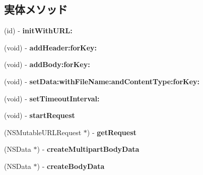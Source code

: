 \subsection*{実体メソッド}
\begin{DoxyCompactItemize}
\item 
\hypertarget{interface_r9_h_t_t_p_request_extension_a3132b244d04c4132fbe71bb4bc282518}{}(id) -\/ {\bfseries init\+With\+U\+R\+L\+:}\label{interface_r9_h_t_t_p_request_extension_a3132b244d04c4132fbe71bb4bc282518}

\item 
\hypertarget{interface_r9_h_t_t_p_request_extension_a095713bf01778a3fabd870784b29791a}{}(void) -\/ {\bfseries add\+Header\+:for\+Key\+:}\label{interface_r9_h_t_t_p_request_extension_a095713bf01778a3fabd870784b29791a}

\item 
\hypertarget{interface_r9_h_t_t_p_request_extension_a7459e8f6b487d60bc6bc8e1f3c26ee78}{}(void) -\/ {\bfseries add\+Body\+:for\+Key\+:}\label{interface_r9_h_t_t_p_request_extension_a7459e8f6b487d60bc6bc8e1f3c26ee78}

\item 
\hypertarget{interface_r9_h_t_t_p_request_extension_ac5e0f736cfc0e8defae6746a2305674a}{}(void) -\/ {\bfseries set\+Data\+:with\+File\+Name\+:and\+Content\+Type\+:for\+Key\+:}\label{interface_r9_h_t_t_p_request_extension_ac5e0f736cfc0e8defae6746a2305674a}

\item 
\hypertarget{interface_r9_h_t_t_p_request_extension_a2afdced2ff69fa98768e041ce9dc0ffb}{}(void) -\/ {\bfseries set\+Timeout\+Interval\+:}\label{interface_r9_h_t_t_p_request_extension_a2afdced2ff69fa98768e041ce9dc0ffb}

\item 
\hypertarget{interface_r9_h_t_t_p_request_extension_a45f1593efbe04c21c6816d72dfab37d2}{}(void) -\/ {\bfseries start\+Request}\label{interface_r9_h_t_t_p_request_extension_a45f1593efbe04c21c6816d72dfab37d2}

\item 
\hypertarget{interface_r9_h_t_t_p_request_extension_a96a0bb891310cdabb4d1f3f62f9dfd1f}{}(N\+S\+Mutable\+U\+R\+L\+Request $\ast$) -\/ {\bfseries get\+Request}\label{interface_r9_h_t_t_p_request_extension_a96a0bb891310cdabb4d1f3f62f9dfd1f}

\item 
\hypertarget{interface_r9_h_t_t_p_request_extension_a39d72b708ab2de0ea16cba504f1a169a}{}(N\+S\+Data $\ast$) -\/ {\bfseries create\+Multipart\+Body\+Data}\label{interface_r9_h_t_t_p_request_extension_a39d72b708ab2de0ea16cba504f1a169a}

\item 
\hypertarget{interface_r9_h_t_t_p_request_extension_a1932a5642faf4a599f655f1ab5c32cac}{}(N\+S\+Data $\ast$) -\/ {\bfseries create\+Body\+Data}\label{interface_r9_h_t_t_p_request_extension_a1932a5642faf4a599f655f1ab5c32cac}

\end{DoxyCompactItemize}
